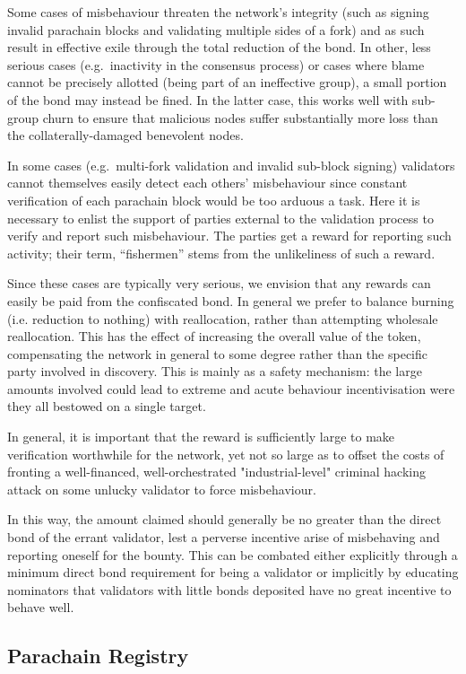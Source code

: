 \documentclass[9pt,oneside]{amsart}
\makeatletter
\newcommand*\eg{e.g.\@\xspace}
\newcommand*\ie{i.e.\@\xspace}
\makeatother
\begin{document}
\begin{multicols}{2}
 Some cases of misbehaviour threaten the network's integrity (such as signing invalid parachain blocks and validating multiple sides of a fork) and as such result in effective exile through the total reduction of the
bond. In other, less serious cases (\eg~inactivity in the consensus process) or cases where blame cannot be precisely allotted (being part of an ineffective group), a small portion of the bond may instead be fined. In the latter case, this works well with sub-group churn to ensure that malicious nodes suffer substantially more loss than the collaterally-damaged benevolent nodes.

In some cases (\eg~multi-fork validation and invalid sub-block signing) validators cannot themselves easily detect each others' misbehaviour since constant verification of each parachain block would be too arduous a task. Here it is necessary to enlist the support of parties external to the validation process to verify and report such misbehaviour. The parties get a reward for reporting such activity; their term, ``fishermen'' stems from the unlikeliness of such a reward.

 Since these cases are typically very serious, we envision that any rewards can easily be paid from the confiscated bond. In general we prefer to balance burning (\ie reduction to nothing) with reallocation, rather than attempting wholesale reallocation. This has the effect of increasing the overall value of the token, compensating the network in general to some degree rather than the specific party involved in discovery. This is mainly as a safety mechanism: the large amounts involved could lead to extreme and acute behaviour incentivisation were they all bestowed on a single target.

 In general, it is important that the reward is sufficiently large to make verification worthwhile for the network, yet not so large as to offset the costs of fronting a well-financed, well-orchestrated "industrial-level" criminal hacking attack on some unlucky validator to force misbehaviour.

 In this way, the amount claimed should generally be no greater than the direct bond of the errant validator, lest a perverse incentive arise of misbehaving and reporting oneself for the bounty. This can be combated either explicitly through a minimum direct bond requirement for being a validator or implicitly by educating nominators that validators with little bonds deposited have no great incentive to behave well.

\subsection{Parachain Registry}
\label{parachain-registry}


\end{multicols}
\end{document}
